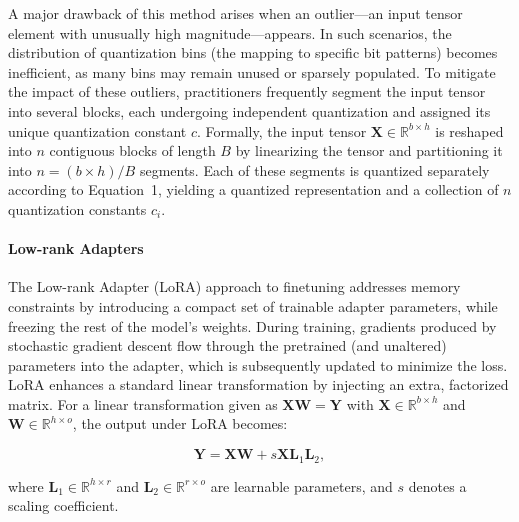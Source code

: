 A major drawback of this method arises when an outlier—an input tensor element with unusually high magnitude—appears. In such scenarios, the distribution of quantization bins (the mapping to specific bit patterns) becomes inefficient, as many bins may remain unused or sparsely populated. To mitigate the impact of these outliers, practitioners frequently segment the input tensor into several blocks, each undergoing independent quantization and assigned its unique quantization constant $c$. Formally, the input tensor $\mathbf{X}\in \mathbb{R}^{b\times h}$ is reshaped into $n$ contiguous blocks of length $B$ by linearizing the tensor and partitioning it into ${n = ({b\times h} )/{B} }$ segments. Each of these segments is quantized separately according to Equation~1, yielding a quantized representation and a collection of $n$ quantization constants $c_i$.

\paragraph{Low-rank Adapters} The Low-rank Adapter (LoRA) approach to finetuning \citep{hu2021lora} addresses memory constraints by introducing a compact set of trainable adapter parameters, while freezing the rest of the model’s weights. During training, gradients produced by stochastic gradient descent flow through the pretrained (and unaltered) parameters into the adapter, which is subsequently updated to minimize the loss. LoRA enhances a standard linear transformation by injecting an extra, factorized matrix. For a linear transformation given as ${\mathbf{X} \mathbf{W} = \mathbf{Y}}$ with $\mathbf{X}\in  \mathbb{R}^{b\times h}$ and $\mathbf{W}\in  \mathbb{R}^{h\times o}$, the output under LoRA becomes:

\begin{equation}
    \mathbf{Y} = \mathbf{X}\mathbf{W} + s\mathbf{X}\mathbf{L}_1\mathbf{L}_2,
\end{equation}

where $\mathbf{L}_1\in  \mathbb{R}^{h\times r}$ and $\mathbf{L}_2\in  \mathbb{R}^{r\times o}$ are learnable parameters, and $s$ denotes a scaling coefficient.


